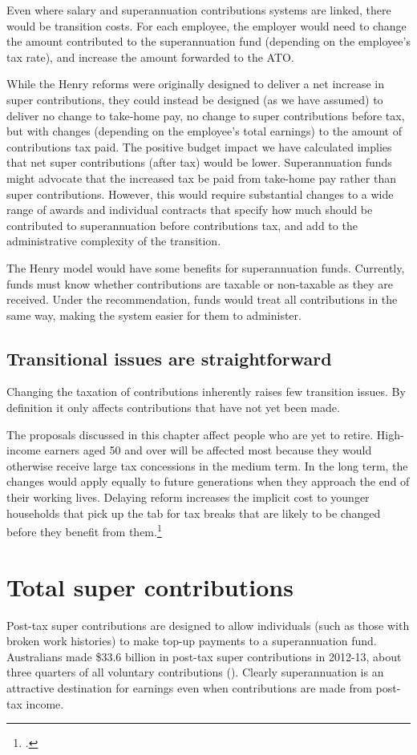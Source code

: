 Even where salary and superannuation contributions systems are linked, there would be transition costs. For each employee, the employer would need to change the amount contributed to the superannuation fund (depending on the employee’s tax rate), and increase the amount forwarded to the ATO. 

While the Henry reforms were originally designed to deliver a net increase in super contributions, they could instead be designed (as we have assumed) to deliver no change to take-home pay, no change to super contributions before tax, but with changes (depending on the employee’s total earnings) to the amount of contributions tax paid. The positive budget impact we have calculated implies that net super contributions (after tax) would be lower. Superannuation funds might advocate that the increased tax be paid from take-home pay rather than super contributions. However, this would require substantial changes to a wide range of awards and individual contracts that specify how much should be contributed to superannuation before contributions tax, and add to the administrative complexity of the transition.

The Henry model would have some benefits for superannuation funds. Currently, funds must know whether contributions are taxable or non-taxable as they are received. Under the recommendation, funds would treat all contributions in the same way, making the system easier for them to administer.

\section{Transitional issues are straightforward}
Changing the taxation of contributions inherently raises few transition issues. By definition it only affects contributions that have not yet been made.

The proposals discussed in this chapter affect people who are yet to retire. High-income earners aged 50 and over will be affected most because they would otherwise receive large tax concessions in the medium term. In the long term, the changes would apply equally to future generations when they approach the end of their working lives. Delaying reform increases the implicit cost to younger households that pick up the tab for tax breaks that are likely to be changed before they benefit from them.\footcite{DaleyWoodWeidmannEtAl2014}

\chapter{Total super contributions} 
Post-tax super contributions are designed to allow individuals (such as those with broken work histories) to make top-up payments to a superannuation fund. Australians made \$33.6 billion in post-tax super contributions in 2012-13, about three quarters of all voluntary contributions (). Clearly superannuation is an attractive destination for earnings even when contributions are made from post-tax income. 

